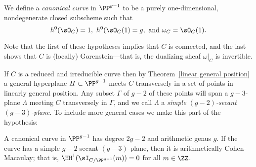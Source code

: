 We define a \emph{canonical curve} in $\PP^{g-1}$ to be a purely one-dimensional, nondegenerate closed subscheme  such that
$$
 h^{0}(\sO_{C}) = 1,\ h^{0}(\sO_{C}(1) = g, \hbox{ and } \omega_{C} = \sO_{C}(1).
$$

Note that the first of these hypotheses implies that $C$ is connected, and the last shows that
$C$ is (locally) Gorenstein---that is, the dualizing sheaf $\omega|_C$ is invertible.

If $C$ is a reduced and irreducible curve then by Theorem~\ref{linear general position} a general hyperplane $H\subset \PP^{g-1}$
meets $C$ transversely in a set of points in linearly general position. Any subset $\Gamma$ of $g-2$ of these points will span a $g-3$-plane $\Lambda$
meeting $C$ transversely in $\Gamma$, and we call $\Lambda$ a \emph{simple $(g-2)$-secant $(g-3)$-plane}. To include more general cases we make this part of the hypothesis:

%
% 
% 
%
\begin{theorem}\label{canonical curves are ACM}
A canonical curve in $\PP^{g-1}$ has degree $2g-2$ and arithmetic genus $g$. If the curve has a simple
$g-2$ secant $(g-3)$-plane, then it is arithmetically Cohen-Macaulay; that is,
$\HH^{1}(\sI_{C/\PP^{g-1}}(m)) = 0$ for all $m\in \ZZ$.
\end{theorem}
  
